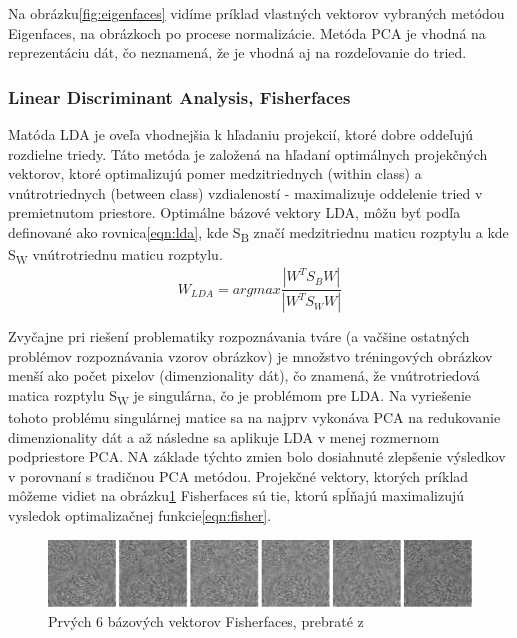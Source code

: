 Na obrázku\ref{fig:eigenfaces} vidíme príklad vlastných vektorov vybraných metódou Eigenfaces, na obrázkoch po procese normalizácie.
Metóda PCA je vhodná na reprezentáciu dát, čo neznamená, že je vhodná aj na rozdeľovanie do tried.

\subsubsection{Linear Discriminant Analysis, Fisherfaces}
Matóda LDA\cite{duda2012pattern} je oveľa vhodnejšia k hľadaniu projekcií, ktoré dobre oddeľujú rozdielne triedy.
Táto metóda je založená na hľadaní optimálnych projekčných vektorov, ktoré optimalizujú pomer medzitriednych (within class) a vnútrotriednych (between class) vzdialeností - maximalizuje oddelenie tried
v premietnutom priestore.
Optimálne bázové vektory LDA, môžu byť podľa\cite{handbookbio} definované ako rovnica\eqref{eqn:lda}, kde S\textsubscript{B} značí medzitriednu maticu rozptylu a kde S\textsubscript{W}
vnútrotriednu maticu rozptylu.\\
\indent
\begin{equation}\label{eqn:lda}
	W_{LDA} = arg max \frac{|W^T S_B W|}{|W^T S_W W|}
\end{equation}

Zvyčajne pri riešení problematiky rozpoznávania tváre (a vačšine ostatných problémov rozpoznávania vzorov obrázkov) je množstvo tréningových obrázkov menší ako počet pixelov
(dimenzionality dát), čo znamená, že vnútrotriedová matica rozptylu S\textsubscript{W} je singulárna, čo je problémom pre LDA.
Na vyriešenie tohoto problému singulárnej matice sa na najprv vykonáva PCA na redukovanie dimenzionality dát a
až následne sa aplikuje LDA v menej rozmernom podpriestore PCA.
NA základe týchto zmien bolo dosiahnuté zlepšenie výsledkov v porovnaní s tradičnou PCA metódou.
Projekčné vektory, ktorých príklad môžeme vidiet na obrázku\ref{fig:fisherfaces}  Fisherfaces sú tie, ktorú spĺňajú maximalizujú vysledok optimalizačnej funkcie\eqref{eqn:fisher}.

\begin{figure}[H]
	\centering
	\includegraphics[width=1\linewidth]{img/fisherfaces.png}
	\caption{Prvých 6 bázových vektorov Fisherfaces, prebraté z\cite[p.~46]{handbookbio}}
	\label{fig:fisherfaces}
\end{figure}

